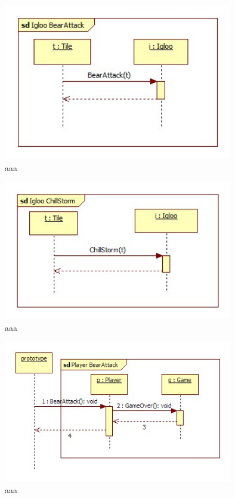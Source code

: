 \begin{figure}[H]
        \begin{center}
                \includegraphics[width=10cm]{chapters/chapter07/seqdiag/Igloo_BearAttack.jpg}
                \caption{aaa}
                \label{bbb}
        \end{center}
\end{figure}
\begin{figure}[H]
        \begin{center}
                \includegraphics[width=10cm]{chapters/chapter07/seqdiag/Igloo_ChillStorm.jpg}
                \caption{aaa}
                \label{bbb}
        \end{center}
\end{figure}
\begin{figure}[H]
        \begin{center}
                \includegraphics[width=10cm]{chapters/chapter07/seqdiag/Player_BearAttack.jpg}
                \caption{aaa}
                \label{bbb}
        \end{center}
\end{figure}
